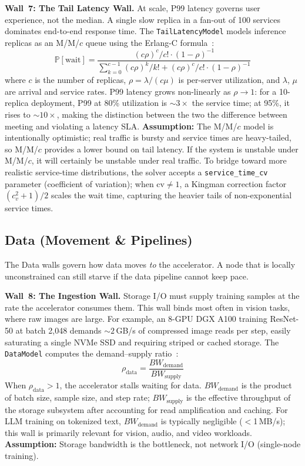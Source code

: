\documentclass[10pt,twocolumn]{article}
\begin{document}
\textbf{Wall~7: The Tail Latency Wall.} At scale, P99 latency governs user experience, not the median. A single slow replica in a fan-out of 100 services dominates end-to-end response time. The \texttt{TailLatencyModel} models inference replicas as an M/M/$c$ queue using the Erlang-C formula~\citep{dean2013}:
\begin{equation}
\label{eq:erlangc}
\mathbb{P}[\text{wait}] = \frac{(c\rho)^c / c! \cdot (1-\rho)^{-1}}{\sum_{k=0}^{c-1}(c\rho)^k/k! + (c\rho)^c/c! \cdot (1-\rho)^{-1}}
\end{equation}
where $c$ is the number of replicas, $\rho = \lambda / (c\mu)$ is per-server utilization, and $\lambda$, $\mu$ are arrival and service rates. P99 latency grows non-linearly as $\rho \to 1$: for a 10-replica deployment, P99 at 80\% utilization is ${\sim}3{\times}$ the service time; at 95\%, it rises to ${\sim}10{\times}$, making the distinction between the two the difference between meeting and violating a latency SLA. \textbf{Assumption:} The M/M/$c$ model is intentionally optimistic; real traffic is bursty and service times are heavy-tailed, so M/M/$c$ provides a lower bound on tail latency. If the system is unstable under M/M/$c$, it will certainly be unstable under real traffic. To bridge toward more realistic service-time distributions, the solver accepts a \texttt{service\_time\_cv} parameter (coefficient of variation); when $\text{cv} \neq 1$, a Kingman correction factor $(c_v^2 + 1)/2$ scales the wait time, capturing the heavier tails of non-exponential service times.

\subsection{Data (Movement \& Pipelines)}
\label{sec:walls-data}

The Data walls govern how data moves \emph{to} the accelerator. A node that is locally unconstrained can still starve if the data pipeline cannot keep pace.

\textbf{Wall~8: The Ingestion Wall.} Storage I/O must supply training samples at the rate the accelerator consumes them. This wall binds most often in vision tasks, where raw images are large. For example, an 8-GPU DGX A100 training ResNet-50 at batch 2{,}048 demands ${\sim}2$\,GB/s of compressed image reads per step, easily saturating a single NVMe SSD and requiring striped or cached storage. The \texttt{DataModel} computes the demand--supply ratio~\citep{mohan2021}:
\begin{equation}
\label{eq:ingestion}
\rho_{\text{data}} = \frac{BW_{\text{demand}}}{BW_{\text{supply}}}
\end{equation}
When $\rho_{\text{data}} > 1$, the accelerator stalls waiting for data. $BW_{\text{demand}}$ is the product of batch size, sample size, and step rate; $BW_{\text{supply}}$ is the effective throughput of the storage subsystem after accounting for read amplification and caching. For LLM training on tokenized text, $BW_{\text{demand}}$ is typically negligible ($<$1\,MB/s); this wall is primarily relevant for vision, audio, and video workloads. \textbf{Assumption:} Storage bandwidth is the bottleneck, not network I/O (single-node training).
\end{document}
